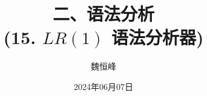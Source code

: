 \documentclass[]{beamer}
\title[语法分析]{二、语法分析 \\ (15. $LR(1)$ 语法分析器)}
\author[魏恒峰]{\large 魏恒峰}
\institute{hfwei@nju.edu.cn}
\date{2024年06月07日}
\begin{document}
\maketitle



\thankyou{}

\end{document}
